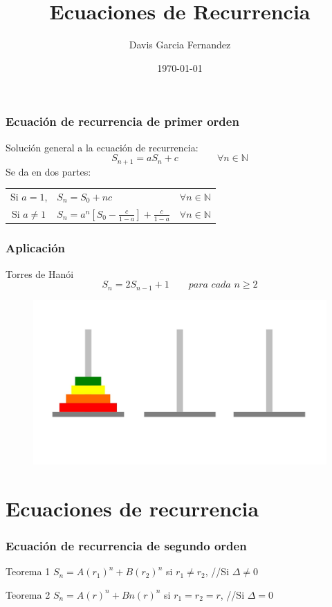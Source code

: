 \documentclass{beamer}
\title{Ecuaciones de Recurrencia}
\author{Davis Garcia Fernandez}
\date{\today}
\begin{document}
\begin{frame}
	\titlepage
\end{frame}

\begin{frame}
	\frametitle{Ecuación de recurrencia de primer orden}
	\begin{block}{}
		Solución general a la ecuación de recurrencia:
		$$S_{n+1} = aS_n + c \qquad \qquad \forall n \in \mathds{N}$$
		Se da en dos partes:
		\begin{tabular}{cll}
			Si $a=1$, & $S_n = S_0 + nc$ & $\forall n \in \mathds{N}$\\
			Si $a\neq 1$& $S_n = a^n [S_0 - \frac{c}{1-a}] + \frac{c}{1-a}$  &$\forall n \in \mathds{N} $
		\end{tabular}
	\end{block}
\end{frame}

\begin{frame}
	\frametitle{Aplicación}
		\begin{block}{Torres de Hanói}
			$$S_n = 2S_{n-1} + 1   \qquad \textit{para cada $n \geq 2$}$$
		\end{block}
			
		\begin{block}{}
			\begin{figure}
			\centering
			\includegraphics[scale=0.15]{torre.jpg}
			\end{figure}
		\end{block}
\end{frame}

\section{Ecuaciones de recurrencia}

\begin{frame}
	\frametitle{Ecuación de recurrencia de segundo orden}
	\begin{block}{Teorema 1}
	$S_n = A(r_1)^n + B(r_2)^n$ si $r_1 \neq r_2$, \;\;\;\;\;\;\;\;\;\;\; //Si $\Delta \neq 0$

	\end{block}
	\begin{block}{Teorema 2}
	$S_n = A(r)^n + Bn(r)^n$ si $r_1 = r_2 = r$, \;\;\;\;\;\;\;\;\;\;\; //Si $\Delta = 0$

	\end{block}
\end{frame}
\end{document}
